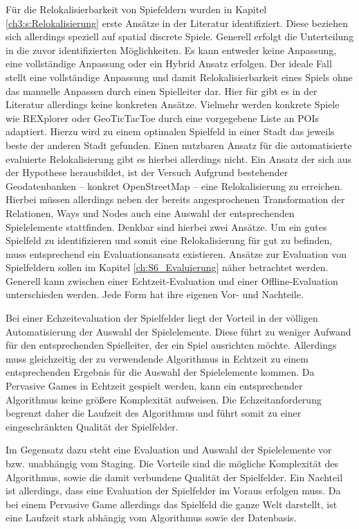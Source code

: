 Für die Relokalisierbarkeit von Spiefeldern wurden in Kapitel \ref{ch3:s:Relokalisierung} erste Ansätze in der Literatur identifiziert. Diese beziehen sich allerdings speziell auf spatial discrete Spiele.
Generell erfolgt die Unterteilung in die zuvor identifizierten Möglichkeiten.
Es kann entweder keine Anpassung, eine vollständige Anpassung oder ein Hybrid Ansatz erfolgen. Der ideale Fall stellt eine vollständige Anpassung und damit Relokalisierbarkeit eines Spiels ohne das manuelle Anpassen durch einen Spielleiter dar. Hier für gibt es in der Literatur allerdings keine konkreten Ansätze. Vielmehr werden konkrete Spiele wie REXplorer \cite{Ballagas.2007} oder GeoTicTacToe \cite{Kiefer.2007} durch eine vorgegebene Liste an POIs adaptiert. Hierzu wird zu einem optimalen Spielfeld in einer Stadt das jeweils beste der anderen Stadt gefunden.
Einen nutzbaren Ansatz für die automatisierte evaluierte Relokalisierung gibt es hierbei allerdings nicht.
Ein Ansatz der sich aus der Hypothese herausbildet, ist der Versuch Aufgrund bestehender Geodatenbanken -- konkret OpenStreetMap -- eine Relokalisierung zu erreichen. Hierbei müssen allerdings neben der bereits angesprochenen Transformation der Relationen, Ways und Nodes auch eine Auswahl der entsprechenden Spielelemente stattfinden. Denkbar sind hierbei zwei Ansätze. Um ein \glqq gutes Spielfeld\grqq{} zu identifizieren und somit eine Relokalisierung für gut zu befinden, muss entsprechend ein Evaluationsansatz existieren. Ansätze zur Evaluation von Spielfeldern sollen im Kapitel \ref{ch:S6_Evaluierung} näher betrachtet werden. Generell kann zwischen einer Echtzeit-Evaluation und einer Offline-Evaluation unterschieden werden. Jede Form hat ihre eigenen Vor- und Nachteile.

Bei einer Echzeitevaluation der Spielfelder liegt der Vorteil in der völligen Automatisierung der Auswahl der Spielelemente. Diese führt zu weniger Aufwand für den entsprechenden Spielleiter, der ein Spiel ausrichten möchte. Allerdings muss gleichzeitig der zu verwendende Algorithmus in Echtzeit zu einem entsprechenden Ergebnis für die Auswahl der Spielelemente kommen. Da Pervasive Games in Echtzeit gespielt werden, kann ein entsprechender Algorithmus keine größere Komplexität aufweisen. Die Echzeitanforderung begrenzt daher die Laufzeit des Algorithmus und führt somit zu einer eingeschränkten Qualität der Spielfelder.

Im Gegensatz dazu steht eine Evaluation und Auswahl der Spielelemente vor bzw. unabhängig vom Staging. Die Vorteile sind die mögliche Komplexität des Algorithmus, sowie die damit verbundene Qualität der Spielfelder. Ein Nachteil ist allerdings, dass eine Evaluation der Spielfelder im Voraus erfolgen muss. Da bei einem Pervasive Game allerdings das Spielfeld die ganze Welt darstellt, ist eine Laufzeit stark abhängig vom Algorithmus sowie der Datenbasis.

